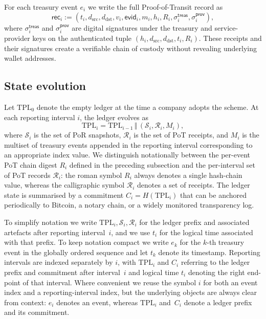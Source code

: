 \documentclass[11pt]{article}
\begin{document}
For each treasury event $e_i$ we write the full Proof-of-Transit record as
\[
  \mathsf{rec}_i := (t_i, d_{\mathrm{src}}, d_{\mathrm{dst}}, v_i,
                     \mathsf{evid}_i, m_i, h_i, R_i,
                     \sigma^{\mathsf{treas}}_i, \sigma^{\mathsf{prov}}_i),
\]
where $\sigma^{\mathsf{treas}}_i$ and $\sigma^{\mathsf{prov}}_i$ are digital signatures
under the treasury and service-provider keys on the authenticated tuple
$(h_i, d_{\mathrm{src}}, d_{\mathrm{dst}}, t_i, R_i)$.
These receipts and their signatures create a verifiable chain of custody without revealing underlying wallet addresses.

\subsection{State evolution}
\label{subsec:state-evolution}
Let $\mathrm{TPL}_0$ denote the empty ledger at the time a company adopts the scheme.
At each reporting interval $i$, the ledger evolves as
\[
  \mathrm{TPL}_i = \mathrm{TPL}_{i-1} \,\Vert\, (\mathcal{S}_i, \mathcal{R}_i, M_i),
\]
where $\mathcal{S}_i$ is the set of PoR snapshots, $\mathcal{R}_i$ is the set of PoT receipts, and $M_i$ is the multiset
of treasury events appended in the reporting interval corresponding to an appropriate index value.
We distinguish notationally between the per-event PoT chain digest $R_i$ defined in the preceding subsection and the
per-interval set of PoT records $\mathcal{R}_i$: the roman symbol $R_i$ always denotes a single hash-chain value,
whereas the calligraphic symbol $\mathcal{R}_i$ denotes a set of receipts.
The ledger state is summarised by a commitment $C_i = H(\mathrm{TPL}_i)$ that can be anchored periodically to Bitcoin,
a notary chain, or a widely monitored transparency log.

To simplify notation we write $\mathrm{TPL}_i, \mathcal{S}_i, \mathcal{R}_i$ for the ledger prefix and associated artefacts
after reporting interval~$i$, and we use $t_i$ for the logical time associated with that prefix.
To keep notation compact we write $e_k$ for the $k$-th treasury event in the globally ordered sequence and
let $t_k$ denote its timestamp.
Reporting intervals are indexed separately by $i$, with $\mathrm{TPL}_i$ and $C_i$ referring to the ledger prefix
and commitment after interval~$i$ and logical time $t_i$ denoting the right end-point of that interval.
Where convenient we reuse the symbol $i$ for both an event index and a reporting-interval index, but the underlying
objects are always clear from context: $e_i$ denotes an event, whereas $\mathrm{TPL}_i$ and~$C_i$ denote a ledger
prefix and its commitment.
\end{document}
